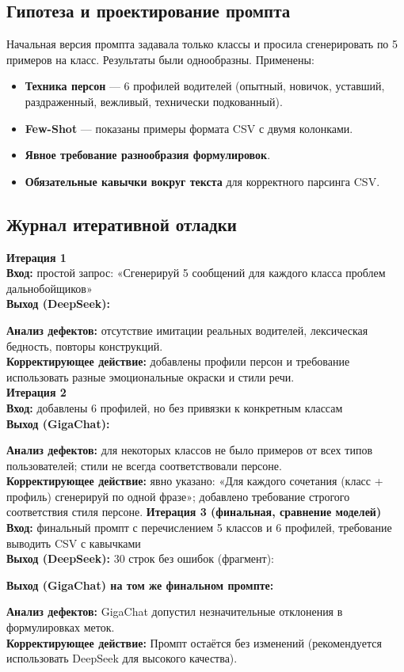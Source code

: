 \documentclass[oneside,a4paper,14pt]{extarticle} %
\begin{document}
	\subsection{Гипотеза и проектирование промпта}
	\noindent
	Начальная версия промпта задавала только классы и просила сгенерировать по 5 примеров на класс. Результаты были однообразны. Применены:
	\begin{itemize}
		\item \textbf{Техника персон} --- 6 профилей водителей (опытный, новичок, уставший, раздраженный, вежливый, технически подкованный).
		\item \textbf{Few-Shot} --- показаны примеры формата CSV с двумя колонками.
		\item \textbf{Явное требование разнообразия формулировок}.
		\item \textbf{Обязательные кавычки вокруг текста} для корректного парсинга CSV.
	\end{itemize}
	\newpage
	\subsection{Журнал итеративной отладки}
	\noindent
	\textbf{Итерация 1} \\
	\noindent
	\textbf{Вход:} простой запрос: «Сгенерируй 5 сообщений для каждого класса проблем дальнобойщиков» \\
	\noindent
	\textbf{Выход (DeepSeek):}
	
	\noindent
	\textbf{Анализ дефектов:} отсутствие имитации реальных водителей, лексическая бедность, повторы конструкций. \\
	\noindent
	\textbf{Корректирующее действие:} добавлены профили персон и требование использовать разные эмоциональные окраски и стили речи. \\
	\newline
	\noindent
	\textbf{Итерация 2} \\
	\noindent
	\textbf{Вход:} добавлены 6 профилей, но без привязки к конкретным классам \\
	\noindent
	\textbf{Выход (GigaChat):}
	
	\noindent
	\textbf{Анализ дефектов:} для некоторых классов не было примеров от всех типов пользователей; стили не всегда соответствовали персоне. \\
	\noindent
	\textbf{Корректирующее действие:} явно указано: «Для каждого сочетания (класс + профиль) сгенерируй по одной фразе»; добавлено требование строгого соответствия стиля персоне.
	\newpage
	\noindent
	\textbf{Итерация 3 (финальная, сравнение моделей)} \\
	\noindent
	\textbf{Вход:} финальный промпт с перечислением 5 классов и 6 профилей, требование выводить CSV с кавычками \\
	\noindent
	\textbf{Выход (DeepSeek):} 30 строк без ошибок (фрагмент):
	
	\noindent
	\textbf{Выход (GigaChat) на том же финальном промпте:}
	
	\noindent
	\textbf{Анализ дефектов:} GigaChat допустил незначительные отклонения в формулировках меток. \\
	\noindent
	\textbf{Корректирующее действие:} Промпт остаётся без изменений (рекомендуется использовать DeepSeek для высокого качества).
	\newpage
\end{document}
